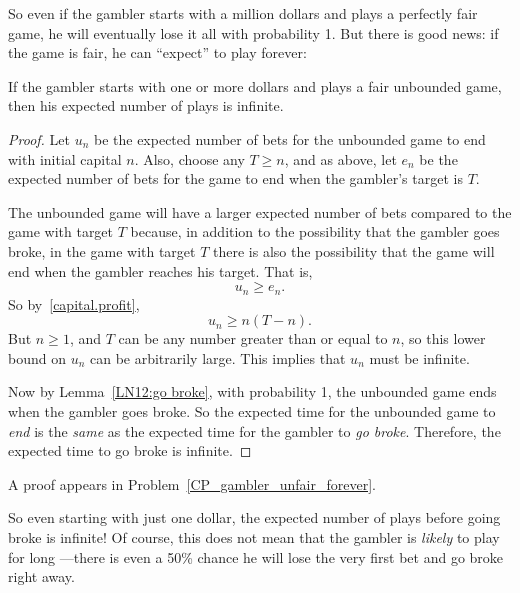 So even if the gambler starts with a million dollars and plays a
perfectly fair game, he will eventually lose it all with probability
1.  But there is good news: if the game is fair, he can ``expect'' to
play forever:

\begin{lemma}\label{LN12:play forever}
If the gambler starts with one or more dollars and plays a fair
unbounded game, then his expected number of plays is infinite.
\end{lemma}

\begin{editingnotes}
\begin{proof}
Let $u_n$ be the expected number of bets for the unbounded game
to end with initial capital $n$.  Also, choose any $T \geq n$, and as
above, let $e_n$ be the expected number of bets for the game to end
when the gambler's target is $T$.


The unbounded game will have a larger expected number of bets compared
to the game with target $T$ because, in addition to the possibility
that the gambler goes broke, in the game with target $T$ there is also
the possibility that the game will end when the gambler reaches his
target.  That is,
\[
u_n \geq e_n.
\]
So by~\eqref{capital.profit},
\[
u_n \geq n(T-n).
\]
But $n \geq 1$, and $T$ can be any number greater than or equal to $n$, so
this lower bound on $u_n$ can be arbitrarily large.  This implies that
$u_n$ must be infinite.

Now by Lemma~\ref{LN12:go broke}, with probability 1, the unbounded game ends
when the gambler goes broke.  So the expected time for the unbounded game
to \emph{end} is the \emph{same} as the expected time for the gambler to
\emph{go broke}.  Therefore, the expected time to go broke is infinite.
\end{proof}
\end{editingnotes}

A proof appears in Problem~\ref{CP_gambler_unfair_forever}.

So even starting with just one dollar, the expected number of plays
before going broke is infinite!  Of course, this does not mean that
the gambler is \emph{likely} to play for long ---there is even a 50\%
chance he will lose the very first bet and go broke right away.

\iffalse In fact, if the game is unfavorable, then
Theorem~\ref{LN12:ExQthm} and Corollary~\ref{LN12:biaswincor} imply
that his expected time to go broke is essentially proportional to his
initial capital, that is, $\Theta(n)$.  \fi

